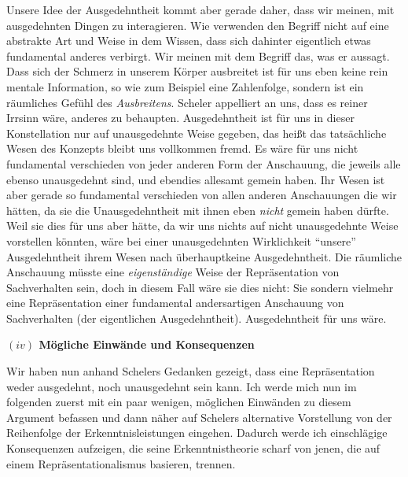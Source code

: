 \documentclass[a4paper, 12pt]{article}
\begin{document}
\begin{onehalfspace}
Unsere Idee der Ausgedehntheit kommt aber gerade daher, dass wir meinen, mit ausgedehnten Dingen zu interagieren. Wie verwenden den Begriff nicht auf eine abstrakte Art und Weise in dem Wissen, dass sich dahinter eigentlich etwas fundamental anderes verbirgt. Wir meinen mit dem Begriff das, was er aussagt. Dass sich der Schmerz in unserem Körper ausbreitet ist für uns eben keine rein mentale Information, so wie zum Beispiel eine Zahlenfolge, sondern ist ein räumliches Gefühl des \emph{Ausbreitens}. Scheler appelliert an uns, dass es reiner Irrsinn wäre, anderes zu behaupten. Ausgedehntheit ist für uns in dieser Konstellation nur auf unausgedehnte Weise gegeben, das heißt das tatsächliche Wesen des Konzepts bleibt uns vollkommen fremd. Es wäre für uns nicht fundamental verschieden von jeder anderen Form der Anschauung, die jeweils alle ebenso unausgedehnt sind, und ebendies allesamt gemein haben. Ihr Wesen ist aber gerade so fundamental verschieden von allen anderen Anschauungen die wir hätten, da sie die Unausgedehntheit mit ihnen eben \emph{nicht} gemein haben dürfte. Weil sie dies für uns aber hätte, da wir uns nichts auf nicht unausgedehnte Weise vorstellen könnten, wäre bei einer unausgedehnten Wirklichkeit "`unsere"' Ausgedehntheit ihrem Wesen nach überhauptkeine Ausgedehntheit. Die räumliche Anschauung müsste eine \emph{eigenständige} Weise der Repräsentation von Sachverhalten sein, doch in diesem Fall wäre sie dies nicht: Sie sondern vielmehr eine Repräsentation einer fundamental andersartigen Anschauung von Sachverhalten (der eigentlichen Ausgedehntheit). Ausgedehntheit für uns wäre. 




\vspace{5mm}
\noindent\textbf{$(iv)$ Mögliche Einwände und Konsequenzen}


\noindent Wir haben nun anhand Schelers Gedanken gezeigt, dass eine Repräsentation weder ausgedehnt, noch unausgedehnt sein kann. Ich werde mich nun im folgenden zuerst mit ein paar wenigen, möglichen Einwänden zu diesem Argument befassen und dann näher auf Schelers alternative Vorstellung von der Reihenfolge der Erkenntnisleistungen eingehen. Dadurch werde ich einschlägige Konsequenzen aufzeigen, die seine Erkenntnistheorie scharf von jenen, die auf einem Repräsentationalismus basieren, trennen.


\end{onehalfspace}
\end{document}
